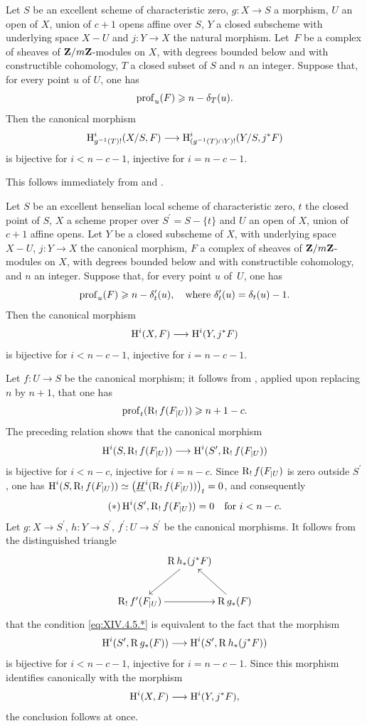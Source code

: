 \begin{corollary} \label{XIV.4.4}
Let $S$ be an excellent scheme of characteristic zero, $g\colon X\to S$ a morphism, $U$ an open of $X$, union of $c+1$ opens affine over $S$, $Y$ a closed subscheme with underlying space $X-U$ and $j\colon Y\to X$ the natural morphism. Let~$F$ be a complex of sheaves of $\mathbf{Z}/m\mathbf{Z}$-modules on $X$, with degrees bounded below and with constructible cohomology, $T$ a closed subset of $S$ and $n$ an integer. Suppose that, for every point $u$ of $U$, one has
$$
\operatorname{prof}_{u}(F)\geqslant n-\delta_{T}(u).
$$
Then the canonical morphism
$$
\H_{g^{-1}(T)!}^{i}(X/S, F)\to\H_{(g^{-1}(T)\cap Y)!}^{i}(Y/S, j^{\ast}F)$$
is bijective for $i<n-c-1$, injective for $i=n-c-1$.
\end{corollary}

This follows immediately from  and .

\begin{corollary} \label{XIV.4.5}
Let $S$ be an excellent henselian local scheme of characteristic zero, $t$ the closed point of $S$, $X$ a scheme proper over $S^{\prime}=S-\{ t\}$ and $U$ an open of $X$, union of $c+1$ affine opens. Let $Y$ be a closed subscheme of $X$, with underlying space $X-U$, $j\colon Y\to X$ the canonical morphism, $F$ a complex of sheaves of $\mathbf{Z}/m\mathbf{Z}$-modules on $X$, with degrees bounded below and with constructible cohomology, and $n$ an integer. Suppose that, for every point $u$ of~$U$, one has
$$
\operatorname{prof}_{u}(F)\geqslant n-\delta_{t}^{\prime}(u), \quad\text{where } \delta_{t}^{\prime}(u)=\delta_{t}(u)-1.
$$
Then the canonical morphism
$$
\H^{i}(X, F)\to\H^{i}(Y, j^{\ast}F)$$
is bijective for $i<n-c-1$, injective for $i=n-c-1$.
\end{corollary}

Let $f\colon U\to S$ be the canonical morphism; it follows from
, applied upon replacing $n$ by $n+1$, that one has
$$
\operatorname{prof}_{t}(\operatorname{R}_{!}f(F_{|U}))\geqslant n+1-c.
$$
The preceding relation shows that the canonical morphism
$$
\H^{i}(S, \R_{!}f(F_{|U}))\to\H^{i}(S^{\prime}, \R_{!}f(F_{|U}))$$
is bijective for $i<n-c$, injective for $i=n-c$. Since $\operatorname{R}_{!}f(F_{|U})$ is zero outside $S^{\prime}$, one has $\operatorname{H}^{i}(S, \operatorname{R}_{!}f(F_{|U}))\simeq\big(\underline{H}^{i}(\operatorname{R}_{!}f(F_{|U}))\big)_{t}=0$, and consequently
\begin{equation*} \label{eq:XIV.4.5.*} \tag{$*$}
\operatorname{H}^{i}(S^{\prime}, \operatorname{R}_{!}f(F_{|U}))=0\quad\text{for }i<n-c.
\end{equation*}
Let $g\colon X\to S^{\prime}$, $h\colon Y\to S^{\prime}$, $f^{\prime}\colon U\to S^{\prime}$ be the canonical morphisms. It follows from the distinguished triangle
$$
\xymatrix@C=0pt{ & \R h_{\ast}(j^{\ast}F)\ar[ld] & \\
\R_{!}f^{\prime}(F_{|U})\ar[rr] & & \R g_{\ast}(F)\ar[lu] }$$
that the condition \eqref{eq:XIV.4.5.*} is equivalent to the fact that the morphism
$$
\H^{i}(S^{\prime}, \R g_{\ast}(F))\to\H^{i}(S^{\prime}, \R h_{\ast}(j^{\ast}F))$$
is bijective for $i<n-c-1$, injective for $i=n-c-1$. Since this morphism identifies canonically with the morphism
$$
\H^{i}(X, F)\to\H^{i}(Y, j^{\ast}F),
$$
the conclusion follows at once.

